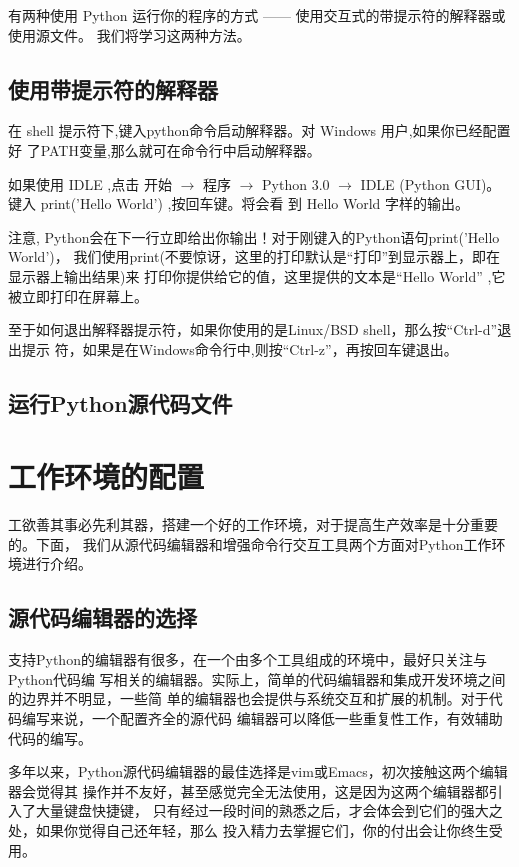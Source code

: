 有两种使用 Python 运行你的程序的方式 —— 使用交互式的带提示符的解释器或使用源文件。
我们将学习这两种方法。

\subsection{使用带提示符的解释器}
在 shell 提示符下,键入python命令启动解释器。对 Windows 用户,如果你已经配置好
了PATH变量,那么就可在命令行中启动解释器。

如果使用 IDLE ,点击 开始 $\rightarrow$ 程序 $\rightarrow$ Python 3.0
$\rightarrow$ IDLE (Python GUI)。键入 print('Hello World') ,按回车键。将会看
到 Hello World 字样的输出。

注意, Python会在下一行立即给出你输出！对于刚键入的Python语句print('Hello World')，
我们使用print(不要惊讶，这里的打印默认是``打印''到显示器上，即在显示器上输出结果)来
打印你提供给它的值，这里提供的文本是``Hello World'' ,它被立即打印在屏幕上。

至于如何退出解释器提示符，如果你使用的是Linux/BSD shell，那么按``Ctrl-d''退出提示
符，如果是在Windows命令行中,则按``Ctrl-z''，再按回车键退出。

\subsection{运行Python源代码文件}




\section{工作环境的配置}

工欲善其事必先利其器，搭建一个好的工作环境，对于提高生产效率是十分重要的。下面，
我们从源代码编辑器和增强命令行交互工具两个方面对Python工作环境进行介绍。

\subsection{源代码编辑器的选择}

支持Python的编辑器有很多，在一个由多个工具组成的环境中，最好只关注与Python代码编
写相关的编辑器。实际上，简单的代码编辑器和集成开发环境之间的边界并不明显，一些简
单的编辑器也会提供与系统交互和扩展的机制。对于代码编写来说，一个配置齐全的源代码
编辑器可以降低一些重复性工作，有效辅助代码的编写。

多年以来，Python源代码编辑器的最佳选择是vim或Emacs，初次接触这两个编辑器会觉得其
操作并不友好，甚至感觉完全无法使用，这是因为这两个编辑器都引入了大量键盘快捷键，
只有经过一段时间的熟悉之后，才会体会到它们的强大之处，如果你觉得自己还年轻，那么
投入精力去掌握它们，你的付出会让你终生受用。

